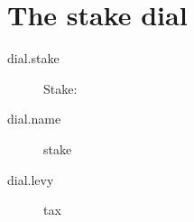 \section{The stake dial}

\begin{description}
  \item[dial.stake] Stake: 
  \item[dial.name] stake
  \item[dial.levy] tax
\end{description}
